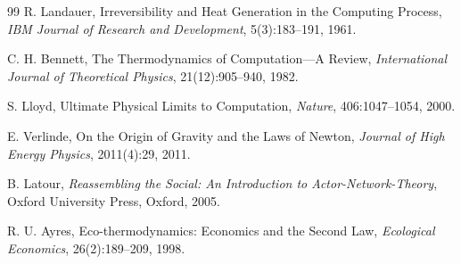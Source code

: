 \documentclass[12pt]{article}
\begin{document}
\begin{thebibliography}{99}
R. Landauer,
Irreversibility and Heat Generation in the Computing Process,
\textit{IBM Journal of Research and Development}, 5(3):183--191, 1961.

C. H. Bennett,
The Thermodynamics of Computation---A Review,
\textit{International Journal of Theoretical Physics}, 21(12):905--940, 1982.

S. Lloyd,
Ultimate Physical Limits to Computation,
\textit{Nature}, 406:1047--1054, 2000.

E. Verlinde,
On the Origin of Gravity and the Laws of Newton,
\textit{Journal of High Energy Physics}, 2011(4):29, 2011.

B. Latour,
\textit{Reassembling the Social: An Introduction to Actor-Network-Theory},
Oxford University Press, Oxford, 2005.

R. U. Ayres,
Eco-thermodynamics: Economics and the Second Law,
\textit{Ecological Economics}, 26(2):189--209, 1998.

\end{thebibliography}
\end{document}
